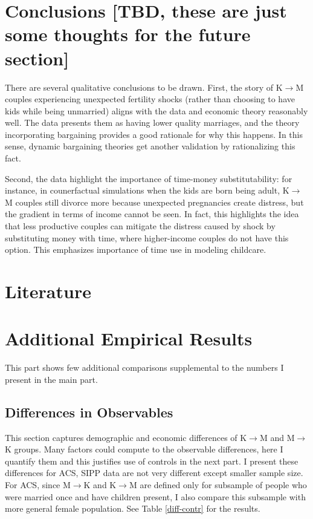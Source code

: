 \documentclass[12pt,letter]{article}
\begin{document}
\section{Conclusions [TBD, these are just some thoughts for the future section]}
There are several qualitative conclusions to be drawn. First, the story of K$\to$M couples experiencing unexpected fertility shocks (rather than choosing to have kids while being unmarried) aligns with the data and economic theory reasonably well. The data presents them as having lower quality marriages, and the theory incorporating bargaining provides a good rationale for why this happens. In this sense, dynamic bargaining theories get another validation by rationalizing this fact.

Second, the data highlight the importance of time-money substitutability: for instance, in counerfactual simulations when the kids are born being adult, K$\to$M couples still divorce more because unexpected pregnancies create distress, but the gradient in terms of income cannot be seen. In fact, this highlights the idea that less productive couples can mitigate the distress caused by shock by substituting money with time, where higher-income couples do not have this option. This emphasizes importance of time use in modeling childcare.
\clearpage

\section*{Literature}



\newpage
\appendix
\section{Additional Empirical Results\label{extra-comparisons}}
This part shows few additional comparisons supplemental to the numbers I present in the main part.

\subsection{Differences in Observables\label{comp-diff-appendix}}
This section captures demographic and economic differences of K$\to$M and M$\to$K groups. Many factors could compute to the observable differences, here I quantify them and this justifies use of controls in the next part. I present these differences for ACS, SIPP data are not very different except smaller sample size. For ACS, since M$\to$K and K$\to$M are defined only for subsample of people who were married once and have children present, I also compare this subsample with more general female population. See Table \ref{diff-contr} for the results.
\end{document}
